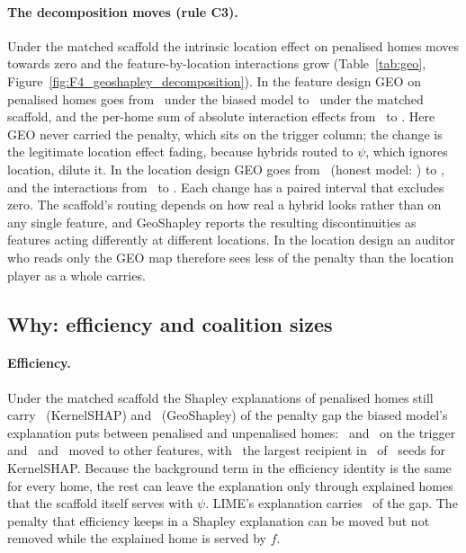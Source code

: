 \paragraph{The decomposition moves (rule C3).} Under the matched scaffold the intrinsic location effect on penalised
homes moves towards zero and the feature-by-location interactions grow (Table~\ref{tab:geo},
Figure~\ref{fig:F4_geoshapley_decomposition}). In the feature design GEO on penalised homes goes from
\FGeoBiasedGeoPen\ under the biased model to \FGeoMatGeoPen\ under the matched scaffold, and the per-home sum of
absolute interaction effects from \FGeoBiasedInt\ to \FGeoMatInt. Here GEO never carried the penalty, which sits on
the trigger column; the change is the legitimate location effect fading, because hybrids routed to $\psi$, which
ignores location, dilute it. In the location design GEO goes from \LGeoBiasedGeoPen\ (honest model:
\LGeoHonestGeoPen) to \LGeoMatGeoPen, and the interactions from \LGeoBiasedInt\ to \LGeoMatInt. Each change has a
paired interval that excludes zero. The scaffold's routing depends on how real a hybrid looks rather than on any single
feature, and GeoShapley reports the resulting discontinuities as features acting differently at different locations.
In the location design an auditor who reads only the GEO map therefore sees less of the penalty than the location
player as a whole carries.



\subsection{Why: efficiency and coalition sizes}
\paragraph{Efficiency.} Under the matched scaffold the Shapley explanations of penalised homes still carry
\FKernelSHAPMatGapTotal\ (KernelSHAP) and \FGeoShapleyMatGapTotal\ (GeoShapley) of the penalty gap the biased model's
explanation puts between penalised and unpenalised homes: \FKernelSHAPMatKept\ and \FGeoShapleyMatKept\ on the trigger
and \FKernelSHAPMatReloc\ and \FGeoShapleyMatReloc\ moved to other features, with \FKernelSHAPMatRelocTo\ the largest recipient in \FKernelSHAPMatRelocToN\ of
\FKernelSHAPMatRelocN\ seeds for KernelSHAP.
Because the background term in the efficiency identity is the same for every home, the rest can leave the
explanation only through explained homes that the scaffold itself serves with $\psi$. LIME's explanation carries
\FLIMEMatGapTotal\ of the gap. The penalty that efficiency keeps in a Shapley explanation can be moved but
not removed while the explained home is served by $f$.

